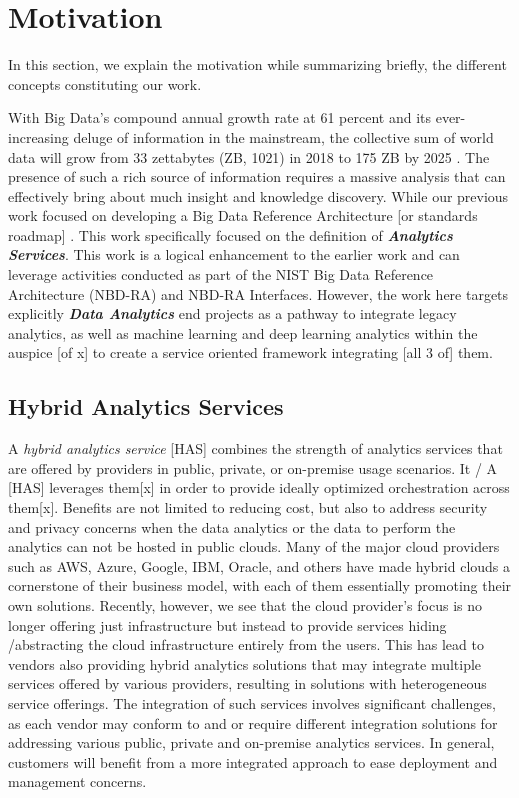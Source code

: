 


\section{Motivation}\label{s:background}

In this section, we explain the motivation  while summarizing
briefly, the different concepts constituting our work.

With Big Data's compound annual growth rate at 61 percent and its
ever-increasing deluge of information in the mainstream, the
collective sum of world data will grow from 33 zettabytes (ZB, 1021)
in 2018 to 175 ZB by 2025 . The presence of such a rich source of
information requires a massive analysis that can effectively bring
about much insight and knowledge discovery. While our previous work
focused on developing a Big Data Reference
Architecture [or standards roadmap] \cite{??}. This work specifically focused on the
definition of {\bf\em Analytics Services}.  This work is a logical
enhancement to the earlier work and can leverage activities conducted
as part of the NIST Big Data Reference Architecture (NBD-RA) and
NBD-RA Interfaces.  However, the work here targets explicitly {\bf\em
Data Analytics} end projects as a pathway to integrate legacy analytics,
as well as machine learning and deep learning analytics within the auspice [of x] to
create a service oriented framework integrating [all 3 of] them.



\subsection{Hybrid Analytics Services}

A {\em hybrid analytics service} [HAS] combines the strength of analytics
services that are offered by providers in public, private, or
on-premise usage scenarios. It / A [HAS] leverages them[x] in order to provide ideally optimized
orchestration across them[x]. Benefits are not limited to reducing cost,
but also to address security and privacy concerns when the data
analytics or the data to perform the analytics can not be hosted in
public clouds. Many of the major cloud providers such as AWS, Azure,
Google, IBM, Oracle, and others have made hybrid clouds a cornerstone
of their business model, with each of them essentially promoting their own
solutions. Recently, however, we see that the cloud provider's focus is no longer
offering just infrastructure but instead to provide services hiding /abstracting the
cloud infrastructure entirely from the users. 
This has lead to vendors
also providing hybrid analytics solutions that may integrate
multiple services offered by various providers, resulting in solutions
with heterogeneous service offerings. The integration of such services
involves significant challenges, as each vendor may conform to and or require different
integration solutions for addressing various public, private and on-premise
analytics services. In general, customers will benefit from a more
integrated approach to ease deployment and management concerns.

